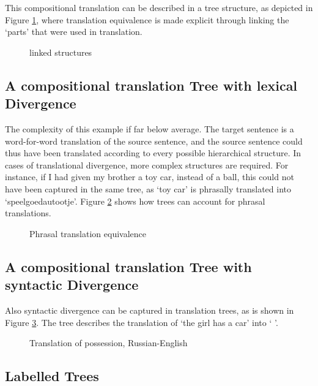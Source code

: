 \documentclass{report}
\begin{document}
This compositional translation can be described in a tree structure, as depicted in Figure \ref{fig:transtrees}, where translation equivalence is made explicit through linking the `parts' that were used in translation.

\begin{figure}[!ht]

\caption{linked structures}\label{fig:transtrees}
\end{figure}

\subsection{A compositional translation Tree with lexical Divergence}

The complexity of this example if far below average. The target sentence is a word-for-word translation of the source sentence, and the source sentence could thus have been translated according to every possible hierarchical structure. In cases of translational divergence, more complex structures are required. For instance, if I had given my brother a toy car, instead of a ball, this could not have been captured in the same tree, as `toy car' is phrasally translated into `speelgoedautootje'. Figure \ref{fig:phrasal} shows how trees can account for phrasal translations.

\begin{figure}[!ht]
\centering

\caption{Phrasal translation equivalence}\label{fig:phrasal}
\end{figure}

\subsection{A compositional translation Tree with syntactic Divergence}

Also syntactic divergence can be captured in translation trees, as is shown in Figure \ref{fig:russian}. The tree describes the translation of `the girl has a car' into `    '.

\begin{figure}[!ht]
\centering

\caption{Translation of possession, Russian-English}\label{fig:russian}
\end{figure}

\subsection{Labelled Trees}
\end{document}
